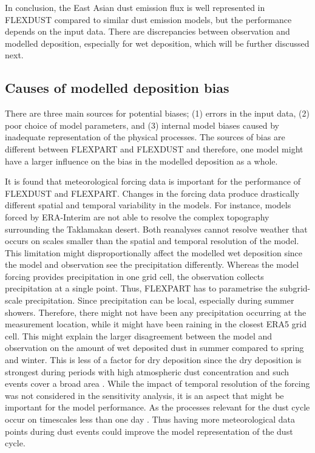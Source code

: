 In conclusion, the East Asian dust emission flux is well represented in FLEXDUST compared to similar dust emission models, but the performance depends on the input data. There are discrepancies between observation and modelled deposition, especially for wet deposition, which will be further discussed next. 

\subsection{Causes of modelled deposition bias}\label{sec:model_uncertainties}

There are three main sources for potential biases; (1) errors in the input data, (2) poor choice of model parameters, and (3) internal model biases caused by inadequate representation of the physical processes. The sources of bias are different between FLEXPART and FLEXDUST and therefore, one model might have a larger influence on the bias in the modelled deposition as a whole.  

It is found that meteorological forcing data is important for the performance of FLEXDUST and FLEXPART.
Changes in the forcing data produce drastically different spatial and temporal variability in the models. For instance, models forced by ERA-Interim are not able to resolve the complex topography surrounding the Taklamakan desert.  Both reanalyses cannot resolve weather that occurs on scales smaller than the spatial and temporal resolution of the model. 
This limitation might disproportionally affect the modelled wet deposition since the model and observation see the precipitation differently.
Whereas the model forcing provides precipitation in one grid cell, the observation collects precipitation at a single point. Thus, FLEXPART has to parametrise the subgrid-scale precipitation. 
Since precipitation can be local, especially during summer showers. 
Therefore, there might not have been any precipitation occurring at the measurement location, while it might have been raining in the closest ERA5 grid cell. 
This might explain the larger disagreement between the model and observation on the amount of wet deposited dust in summer compared to spring and winter. 
This is less of a factor for dry deposition since the dry deposition is strongest during periods with high atmospheric dust concentration and such events cover a broad area \parencite{osada2014wet}.  
While the impact of temporal resolution of the forcing was not considered in the sensitivity analysis, it is an aspect that might be important for the model performance. As the processes relevant for the dust cycle occur on timescales less than one day \parencite{shao2011dust}. Thus having more meteorological data points during dust events could improve the model representation of the dust cycle.  

